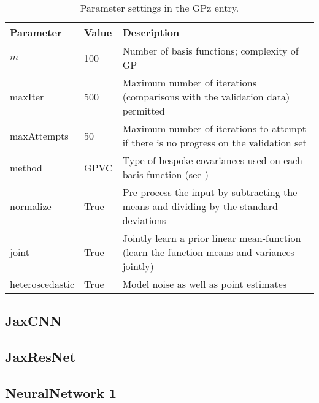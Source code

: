 \documentclass[twocolumn,twocolappendix]{aastex63}
\begin{document}
\begin{table*}[]
\begin{center}
    \begin{tabular}{| l | l | l |}
    \hline
    Parameter   &   Value   &   Description\\  
    \hline 
    $m$         &   100     &   Number of basis functions; complexity of GP\\

    maxIter     &   500     &   Maximum number of iterations (comparisons with 
                                the validation data) permitted\\

    maxAttempts &   50      &   Maximum number of iterations to attempt if there 
                                is no progress on the validation set\\

    method      &   GPVC    &   Type of bespoke covariances used on each basis 
                                function (see \citealp{Almosallam2016b})\\

    normalize   &   True    &   Pre-process the input by subtracting the means
                                and dividing by the standard deviations\\

    joint       &   True    &   Jointly learn a prior linear mean-function 
                                (learn the function means and variances 
                                jointly)\\

    heteroscedastic  & True & Model noise as well as point estimates \\
    \hline
    \end{tabular}
\caption{Parameter settings in the GPz entry.}
\end{center}
\label{table-settings}
\end{table*}

\subsection{ {\sc JaxCNN} }


\subsection{ {\sc JaxResNet} }


\subsection{ {\sc NeuralNetwork 1} }
\end{document}
